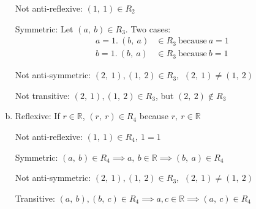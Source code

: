 \documentclass[11pt]{article}
\begin{document}
\begin{enumerate}[(a)]
		Not anti-reflexive: $(1,\ 1) \in R_2$
		
		Symmetric: Let $(a,\ b) \in R_3$. Two cases:
		\begin{align*}
		a = 1 \text{.}\ (b,\ a) &\in R_3\ \text{because}\ a = 1\\	
		b = 1 \text{.}\ (b,\ a) &\in R_3\ \text{because}\ b = 1
		\end{align*}
		
		Not anti-symmetric: $(2,\ 1), (1,\ 2) \in R_3$, $\ (2,\ 1) \ne (1,\ 2)$
		
		Not transitive: $(2,\ 1), (1,\ 2) \in R_3$, but $(2,\ 2) \not\in R_3$
		
	\item
		Reflexive: If $r \in \mathbb{R}$, $(r,\ r) \in R_4$ because $r,\ 
		r\in \mathbb{R}$
		
		Not anti-reflexive: $(1,\ 1) \in R_4,\ 1 = 1$
		
		Symmetric: $(a,\ b) \in R_4 \implies a,\ b \in \mathbb{R} \implies (b,\ 
		a) \in R_4$
		
		Not anti-symmetric:  $(2,\ 1), (1,\ 2) \in R_3$, $\ (2,\ 1) \ne (1,\ 2)$
		
		Transitive: $(a,\ b), (b,\ c) \in R_4 \implies a, c \in \mathbb{R} 
		\implies (a,\ c)\in R_4$	
	\end{enumerate}
\end{document}
